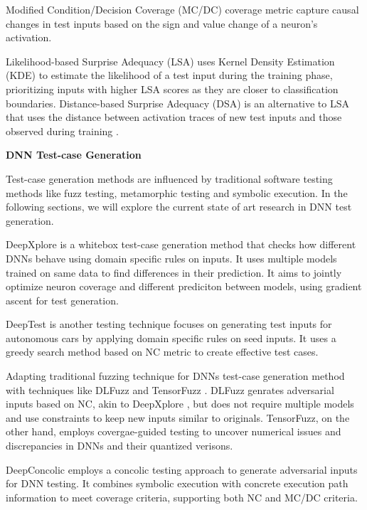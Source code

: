 \documentclass[10pt, conference, a4paper, final]{IEEEtran}
\begin{document}
Modified Condition/Decision Coverage (MC/DC) \cite{SunY} coverage metric  capture causal changes in test inputs based on the sign and value change of a neuron's activation. 

Likelihood-based Surprise Adequacy (LSA) uses Kernel Density Estimation (KDE) to estimate the likelihood of a test input during the training phase, prioritizing inputs with higher LSA scores as they are closer to classification boundaries. Distance-based Surprise Adequacy (DSA) is an alternative to LSA that uses the distance between activation traces of new test inputs and those observed during training \cite{KimJ}.

\smallskip\noindent%
\textbf{DNN Test-case Generation}



Test-case generation methods are influenced by traditional software testing methods like fuzz testing, metamorphic testing and symbolic execution. In the following sections, we will explore the current state of art research in DNN test generation.

DeepXplore \cite{deepxplore} is a whitebox test-case generation method that checks how different DNNs behave using domain specific rules on inputs. It uses multiple models trained on same data to find differences in their prediction. It aims to jointly optimize neuron coverage and different prediciton  between models, using gradient ascent for test generation.


DeepTest \cite{deeptest} is another testing technique focuses on generating test inputs for autonomous cars by applying domain specific rules on seed inputs. It uses a greedy search method based on NC metric to create effective test cases.

Adapting traditional fuzzing technique for DNNs test-case generation method with techniques like DLFuzz \cite{dlfuzz} and TensorFuzz \cite{tensorfuzz}. DLFuzz genrates adversarial inputs based on NC, akin to DeepXplore \cite{deepxplore}, but does not require multiple models and use constraints to keep new inputs similar to originals. TensorFuzz, on the other hand, employs covergae-guided testing to uncover numerical issues and discrepancies in DNNs and their quantized verisons.

DeepConcolic \cite{deepconcolic} employs a concolic testing approach to generate adversarial inputs for DNN testing. It combines symbolic execution with concrete execution path information to meet coverage criteria, supporting both NC and MC/DC criteria.
\end{document}
